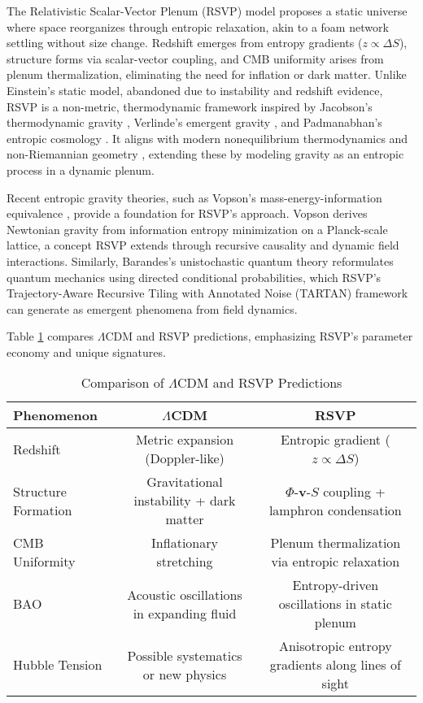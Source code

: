 \documentclass[11pt]{article}
\theoremstyle{plain}
\theoremstyle{definition}
\begin{document}
The Relativistic Scalar-Vector Plenum (RSVP) model proposes a static universe where space reorganizes through entropic relaxation, akin to a foam network settling without size change. Redshift emerges from entropy gradients ($z \propto \Delta S$), structure forms via scalar-vector coupling, and CMB uniformity arises from plenum thermalization, eliminating the need for inflation or dark matter. Unlike Einstein’s static model, abandoned due to instability and redshift evidence, RSVP is a non-metric, thermodynamic framework inspired by Jacobson’s thermodynamic gravity \citep{Jacobson1995}, Verlinde’s emergent gravity \citep{Verlinde2011}, and Padmanabhan’s entropic cosmology \citep{Padmanabhan2015}. It aligns with modern nonequilibrium thermodynamics and non-Riemannian geometry \citep{Shao2023}, extending these by modeling gravity as an entropic process in a dynamic plenum.

Recent entropic gravity theories, such as Vopson’s mass-energy-information equivalence \citep{Vopson2022}, provide a foundation for RSVP’s approach. Vopson derives Newtonian gravity from information entropy minimization on a Planck-scale lattice, a concept RSVP extends through recursive causality and dynamic field interactions. Similarly, Barandes’s unistochastic quantum theory \citep{Barandes2024} reformulates quantum mechanics using directed conditional probabilities, which RSVP’s Trajectory-Aware Recursive Tiling with Annotated Noise (TARTAN) framework can generate as emergent phenomena from field dynamics.

Table \ref{tab:comparison} compares $\Lambda$CDM and RSVP predictions, emphasizing RSVP’s parameter economy and unique signatures.

\begin{table}[ht]
\centering
\caption{Comparison of $\Lambda$CDM and RSVP Predictions}
\label{tab:comparison}
\begin{tabular}{lcc}
\toprule
Phenomenon & $\Lambda$CDM & RSVP \\
\midrule
Redshift & Metric expansion (Doppler-like) & Entropic gradient ($z \propto \Delta S$) \\
Structure Formation & Gravitational instability + dark matter & $\Phi$-$\bm{v}$-$S$ coupling + lamphron condensation \\
CMB Uniformity & Inflationary stretching & Plenum thermalization via entropic relaxation \\
BAO & Acoustic oscillations in expanding fluid & Entropy-driven oscillations in static plenum \\
Hubble Tension & Possible systematics or new physics & Anisotropic entropy gradients along lines of sight \\
\bottomrule
\end{tabular}
\end{table}
\end{document}
